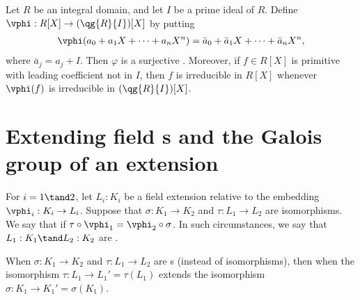 \documentclass{article}
\begin{document}
  \begin{ttheorem}
    Let \( R \) be an integral domain, and let \( I \) be a prime ideal of \( R \).
    Define \( \vphi:R[X]\to (\qg{R}{I})[X] \) by putting \begin{align*}
      \vphi(a_0+a_1X+\cdots+a_nX^n) =\bar a_0+\bar a_1X+\cdots+\bar a_nX^n,
    \end{align*}
    where \( \bar a_j = a_j + I \).
    Then \( \varphi \) is a surjective \homo.
    Moreover, if \( f\in R[X] \) is primitive with leading coefficient not in \( I \), then \( f \) is irreducible in \( R[X] \) whenever \( \vphi(f) \) is irreducible in \( (\qg{R}{I})[X] \).
  \end{ttheorem}


\setcounter{tdefinition}{15}
\setcounter{section}{2}
\section{Extending field \homo s and the Galois group of an extension}
  \begin{tdefinition}
    For \( i = 1 \tand 2 \), let \( L_i : K_i \) be a field extension relative to the embedding \( \vphi_i : K_i\to L_i \).
    Suppose that \( \sigma : K_1\to K_2 \) and \( \tau:L_1\to L_2 \) are isomorphisms.
    We say that  if \( \tau\circ\vphi_1 = \vphi_2\circ\sigma \).
    In such circumstances, we say that \( L_1 : K_1 \tand L_2 : K_2 \) are .

    When \( \sigma:K_1\to K_2 \) and \( \tau:L_1\to L_2 \) are \homo s (instead of isomorphisms), then   when the isomorphism \( \tau:L_1\to L_1' = \tau(L_1) \) extends the isomorphism \( \sigma:K_1\to K_1' = \sigma(K_1) \).
  \end{tdefinition}
\end{document}
